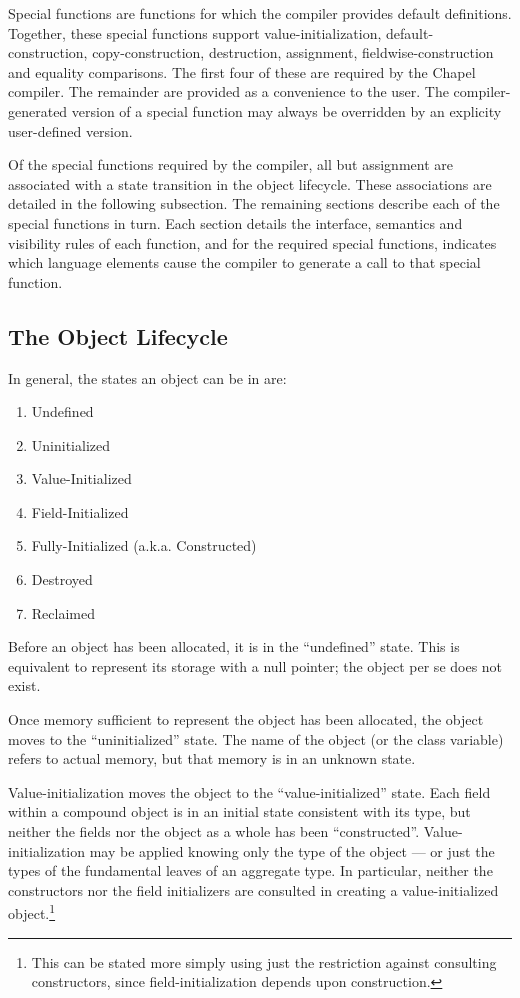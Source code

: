 
Special functions are functions for which the compiler provides default definitions.  
Together, these special functions support
value-initialization, default-construction,
copy-construction, destruction, assignment, fieldwise-construction and equality comparisons.
The first four of these are required by the Chapel
compiler.  The remainder are provided as a convenience
to the user.  The compiler-generated version of a special function may always be
overridden by an explicity user-defined version.

Of the special functions required by the compiler, all but assignment are associated with
a state transition in the object lifecycle.  These associations are detailed in the
following subsection.  The remaining sections describe each of the special functions in
turn.  Each section details the interface, semantics and visibility rules of each
function, and for the required special functions, indicates which language elements cause
the compiler to generate a call to that special function.

\subsection{The Object Lifecycle}

In general, the states an object can be in are:
\begin{enumerate}
\item Undefined
\item Uninitialized
\item Value-Initialized
\item Field-Initialized
\item Fully-Initialized (a.k.a. Constructed)
\item Destroyed
\item Reclaimed
\end{enumerate}

Before an object has been allocated, it is in the ``undefined'' state.  This is
equivalent to represent its storage with a null pointer; the object per se does
not exist.

Once memory sufficient to represent the object has been allocated, the object
moves to the ``uninitialized'' state.  The name of the object (or the class
variable) refers to actual memory, but that memory is in an unknown state.

Value-initialization moves the object to the ``value-initialized'' state.  Each
field within a compound object is in an initial state consistent with its type,
but neither the fields nor the object as a whole has been ``constructed''.
Value-initialization may be applied knowing only the type of the object --- or
just the types of the fundamental leaves of an aggregate type.  In particular,
neither the constructors nor the field initializers are consulted in creating a
value-initialized object.\footnote{This can be stated more simply using just the
  restriction against consulting constructors, since field-initialization
  depends upon construction.}

